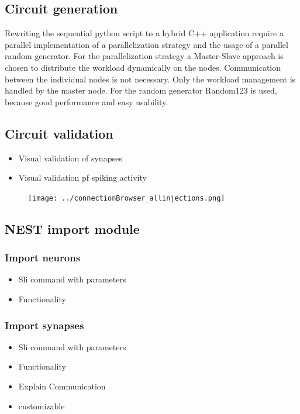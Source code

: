 \documentclass[a4paper]{article}
\begin{document}
\subsection{Circuit generation}
Rewriting the sequential python script to a hybrid C++ application require a parallel implementation of a parallelization strategy and the usage of 
a parallel random generator. For the parallelization strategy a Master-Slave approach is chosen to distribute the workload dynamically on the nodes.
Communication between the individual nodes is not necessary. Only the workload management is handled by the master node.
For the random generator Random123 is used, because good performance and easy usability.

\subsection{Circuit validation}
\begin{itemize}
      \item Visual validation of synapses
      \item Visual validation pf spiking activity
\end{itemize}

\begin{figure}[ht!]
\centering
\texttt{[image: ../connectionBrowser\_allinjections.png]}
\end{figure}

\subsection{NEST import module}
\subsubsection{Import neurons}
\begin{itemize}
      \item Sli command with parameters
      \item Functionality
\end{itemize}

\subsubsection{Import synapses}
\begin{itemize}
      \item Sli command with parameters
      \item Functionality
      \item Explain Communication
      \item customizable
\end{itemize}
\end{document}
